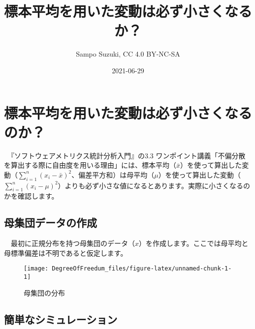 \documentclass[]{tufte-handout}
\title[標本平均を用いた変動は必ず小さくなるのか？]{標本平均を用いた変動は必ず小さくなるか？}
\author{Sampo Suzuki, CC 4.0 BY-NC-SA}
\date{2021-06-29}
\begin{document}
\maketitle




\hypertarget{ux6a19ux672cux5e73ux5747ux3092ux7528ux3044ux305fux5909ux52d5ux306fux5fc5ux305aux5c0fux3055ux304fux306aux308bux306eux304b}{%
\section{\texorpdfstring{\textbf{標本平均を用いた変動は必ず小さくなるのか？}}{標本平均を用いた変動は必ず小さくなるのか？}}\label{ux6a19ux672cux5e73ux5747ux3092ux7528ux3044ux305fux5909ux52d5ux306fux5fc5ux305aux5c0fux3055ux304fux306aux308bux306eux304b}}

　『ソフトウェアメトリクス統計分析入門』\citep{SoftwareMetrics:jbook}の3.3
ワンポイント講義「不偏分散を算出する際に自由度を用いる理由」には、標本平均（\(\bar{x}\)）を使って算出した変動（\(\sum_{i = 1}^{n}(x_i - \bar{x})^2\)、偏差平方和）は母平均（\(\mu\)）を使って算出した変動（\(\sum_{i = 1}^{n}(x_i - \mu)^2\)）よりも必ず小さな値になるとあります。実際に小さくなるのかを確認します。

\hypertarget{ux6bcdux96c6ux56e3ux30c7ux30fcux30bfux306eux4f5cux6210}{%
\subsection{\texorpdfstring{\textbf{母集団データの作成}}{母集団データの作成}}\label{ux6bcdux96c6ux56e3ux30c7ux30fcux30bfux306eux4f5cux6210}}

　最初に正規分布を持つ母集団のデータ（\(x\)）を作成します。ここでは母平均と母標準偏差は不明であると仮定します。

\begin{figure}

{\centering \texttt{[image: DegreeOfFreedum\_files/figure-latex/unnamed-chunk-1-1]} 

}

\caption[母集団の分布]{母集団の分布}\label{fig:unnamed-chunk-1}
\end{figure}

\newpage

\hypertarget{ux7c21ux5358ux306aux30b7ux30dfux30e5ux30ecux30fcux30b7ux30e7ux30f3}{%
\subsection{\texorpdfstring{\textbf{簡単なシミュレーション}}{簡単なシミュレーション}}\label{ux7c21ux5358ux306aux30b7ux30dfux30e5ux30ecux30fcux30b7ux30e7ux30f3}}
\end{document}
